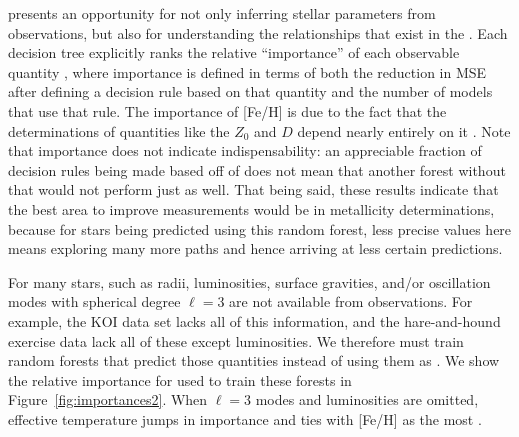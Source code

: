  presents an opportunity for not only inferring stellar parameters from observations, but also for understanding the relationships that exist in the . Each decision tree explicitly ranks the relative ``importance'' of each observable quantity , where importance is defined in terms of both the reduction in MSE after defining a decision rule based on that quantity and the number of models that use that rule.  The importance of [Fe/H] is due to the fact that the determinations of quantities like the $Z_0$ and $D$ depend nearly entirely on it \citep[see also][]{2017apj...839..116a}. Note that importance does not indicate indispensability: an appreciable fraction of decision rules being made based off of  does not mean that another forest without that  would not perform just as well. That being said, these results indicate that the best area to improve measurements would be in metallicity determinations, because for stars being predicted using this random forest, less precise values here means exploring many more paths and hence arriving at less certain predictions. 

For many stars,  such as radii, luminosities, surface gravities, and/or oscillation modes with spherical degree ${\ell=3}$ are not available from observations. For example, the KOI data set  lacks all of this information, and the hare-and-hound exercise data  lack all of these except luminosities. We therefore must train random forests that predict those quantities instead of using them as . We show the relative importance for  used to train these forests in Figure~\ref{fig:importances2}. When ${\ell=3}$ modes and luminosities are omitted, effective temperature jumps in importance and ties with [Fe/H] as the most . 

